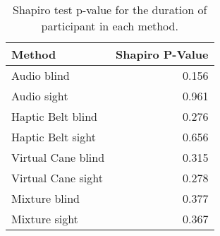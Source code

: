 
\begin{table}[!htb]
\centering
\caption{Shapiro test p-value for the duration of participant in each method.}
\label{tab:shapiro_duration}
\begin{tabular}{lr}
\toprule
            Method &  Shapiro P-Value \\
\midrule
       Audio blind &            0.156 \\
       Audio sight &            0.961 \\
 Haptic Belt blind &            0.276 \\
 Haptic Belt sight &            0.656 \\
Virtual Cane blind &            0.315 \\
Virtual Cane sight &            0.278 \\
     Mixture blind &            0.377 \\
     Mixture sight &            0.367 \\
\bottomrule
\end{tabular}
\end{table}


